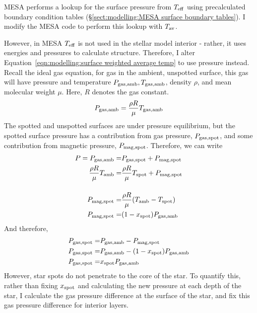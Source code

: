 MESA performs a lookup for the surface pressure from $T_{\rm eff}$ using precalculated boundary condition tables (\S\ref{sect:modelling:MESA surface boundary tables}). I modify the MESA code to perform this lookup with $T_{\rm av}$.

However, in MESA $T_{\rm eff}$ is not used in the stellar model interior - rather, it uses energies and pressures to calculate structure. Therefore, I alter Equation~\ref{eqn:modelling:surface weighted average temp} to use pressure instead.
Recall the ideal gas equation, for gas in the ambient, unspotted surface, this gas will have pressure and temperature $P_{\rm gas, amb}, T_{\rm gas, amb}$, density $\rho$, and mean molecular weight $\mu$. Here, $R$ denotes the gas constant.
\begin{equation}
    P_{\rm gas, amb} = \frac{\rho R}{\mu} T_{\rm gas, amb}
\end{equation}
The spotted and unspotted surfaces are under pressure
equilibrium, but the spotted surface pressure has a contribution from gas pressure, $P_{\rm gas, spot}$, and some contribution from magnetic pressure, $P_{\rm mag, spot}$. Therefore, we can write
\begin{align}
    P = P_{\rm gas, amb} =& P_{\rm gas, spot} + P_{\rm mag, spot} \\
    \frac{\rho R}{\mu} T_{\rm amb} =& \frac{\rho R}{\mu} T_{\rm spot} + P_{\rm mag, spot} \\[12pt]
    P_{\rm mag, spot} =& \frac{\rho R}{\mu} (T_{\rm amb} - T_{\rm spot}) \\
    P_{\rm mag, spot} =& (1-x_{\rm spot}) P_{\rm gas, amb} \\
\end{align}
And therefore,
\begin{align}
    P_{\rm gas, spot} =& P_{\rm gas, amb} - P_{\rm mag, spot}\\
    P_{\rm gas, spot} =& P_{\rm gas, amb} - (1-x_{\rm spot}) P_{\rm gas, amb} \\
    P_{\rm gas, spot} =& x_{\rm spot} P_{\rm gas, amb}
\end{align}
However, star spots do not penetrate to the core of the star. To quantify this, rather than fixing $x_{\rm spot}$ and calculating the new pressure at each depth of the star, I calculate the gas pressure difference at the surface of the star, and fix this gas pressure difference for interior layers.
